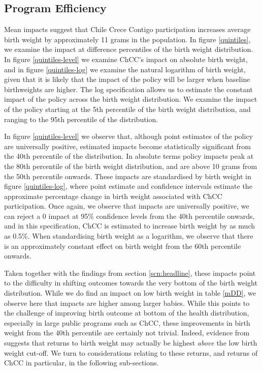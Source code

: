 \documentclass[12pt]{article}
\begin{document}
\begin{spacing}{1.4}
\subsection{Program Efficiency}
Mean impacts suggest that Chile Crece Contigo participation
increases average birth weight by approximately 11 grams in
the population.  In figure \ref{quintiles}, we examine the impact
at difference percentiles of the birth weight distribution.
In figure \ref{quintiles-level} we examine ChCC's impact on
absolute birth weight, and in figure \ref{quintiles-log} we
examine the natural logarithm of birth weight, given that it
is likely that the impact of the policy will be larger when
baseline birthweights are higher.  The log specification allows 
us to estimate the constant impact of the policy across the
birth weight distribution.  We examine the impact of the
policy starting at the 5th percentile of the birth weight
distribution, and ranging to the 95th percentile of the
distribution.

In figure \ref{quintiles-level} we observe that, although
point estimates of the policy are universally positive,
estimated impacts become statistically significant from the
40th percentile of the distribution.  In absolute terms
policy impacts peak at the 80th percentile of the birth weight
distribution, and are above 10 grams from the 50th percentile
onwards.  These impacts are standardised by birth weight
in figure \ref{quintiles-log}, where point estimate and
confidence intervals estimate the approximate percentage
change in birth weight associated with ChCC participation.
Once again, we observe that impacts are universally positive,
we can reject a 0 impact at 95\% confidence levels from the
40th percentile onwards, and in this specification, ChCC
is estimated to increase birth weight by as much as 0.5\%.
When standardising birth weight as a logarithm, we observe
that there is an approximately constant effect on birth
weight from the 60th percentile onwards.

Taken together with the findings from section
\ref{scn:headline}, these impacts point to the difficulty
in shifting outcomes towards the very bottom of the birth
weight distribution.  While we do find an impact on low
birth weight in table \ref{mDD}, we observe here that
impacts are higher among larger babies.  While this points
to the challenge of improving birth outcome at bottom of the
health distribution, especially in large public programs such
as ChCC, these improvements in birth weight from the 40th
percentile are certainly not trivial.  Indeed, evidence
from \citet{Royer2009} suggests that returns to birth weight
may actually be highest \emph{above} the low birth weight
cut-off.  We turn to considerations relating to these returns,
and returns of ChCC in particular, in the following
sub-sections.


\end{spacing}
\end{document}
